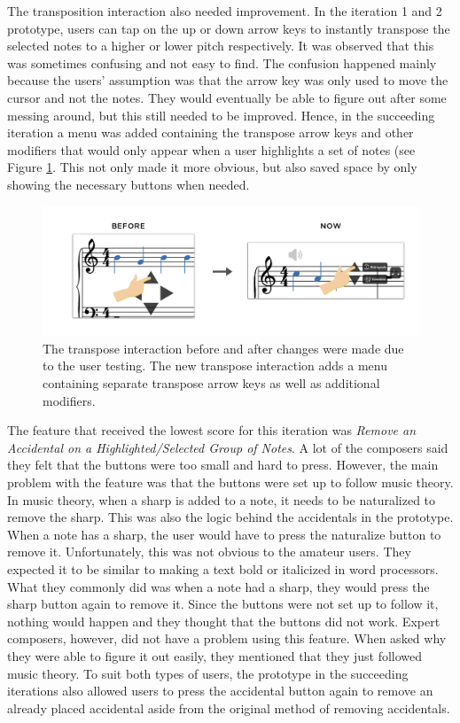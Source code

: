 			The transposition interaction also needed improvement. In the iteration 1 and 2 prototype, users can tap on the up or down arrow keys to instantly transpose the selected notes to a higher or lower pitch respectively. It was observed that this was sometimes confusing and not easy to find. The confusion happened mainly because the users' assumption was that the arrow key was only used to move the cursor and not the notes. They would eventually be able to figure out after some messing around, but this still needed to be improved. Hence, in the succeeding iteration a menu was added containing the transpose arrow keys and other modifiers that would only appear when a user highlights a set of notes (see Figure \ref{fig:transpose}. This not only made it more obvious, but also saved space by only showing the necessary buttons when needed.

			\begin{figure}[h]
				\centering
				\includegraphics[scale=0.25]{figures/before-after-transpose-notes}
			    \caption{The transpose interaction before and after changes were made due to the user testing. The new transpose interaction adds a menu containing separate transpose arrow keys as well as additional modifiers.}
			    \label{fig:transpose}
			\end{figure}

			The feature that received the lowest score for this iteration was \textit{Remove an Accidental on a Highlighted/Selected Group of Notes}. A lot of the composers said they felt that the buttons were too small and hard to press. However, the main problem with the feature was that the buttons were set up to follow music theory. In music theory, when a sharp is added to a note, it needs to be naturalized to remove the sharp. This was also the logic behind the accidentals in the prototype. When a note has a sharp, the user would have to press the naturalize button to remove it. Unfortunately, this was not obvious to the amateur users. They expected it to be similar to making a text bold or italicized in word processors. What they commonly did was when a note had a sharp, they would press the sharp button again to remove it. Since the buttons were not set up to follow it, nothing would happen and they thought that the buttons did not work. Expert composers, however, did not have a problem using this feature. When asked why they were able to figure it out easily, they mentioned that they just followed music theory. To suit both types of users, the prototype in the succeeding iterations also allowed users to press the accidental button again to remove an already placed accidental aside from the original method of removing accidentals.

